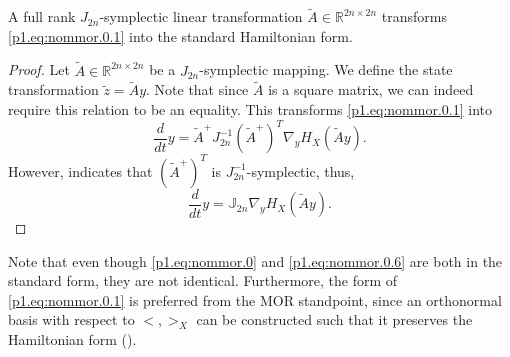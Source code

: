 \begin{lemma} \label{thm:2.1}
A full rank $J_{2n}$-symplectic linear transformation $\tilde A \in \mathbb R^{2n\times 2n}$ transforms \eqref{p1.eq:nommor.0.1} into the standard Hamiltonian form. 
\end{lemma}

\begin{proof}
Let $\tilde A\in \mathbb R^{2n\times 2n}$ be a $J_{2n}$-symplectic mapping. We define the state transformation $\tilde z = \tilde Ay$. Note that since $\tilde A$ is a square matrix, we can indeed require this relation to be an equality. This transforms \eqref{p1.eq:nommor.0.1} into
\begin{equation} \label{p1.eq:nommor.0.5}
	\frac{d}{dt} y = \tilde A^+ J_{2n}^{-1} (\tilde A^+)^T \nabla_y H_X(\tilde Ay).
\end{equation}
However,  indicates that $(\tilde A^+)^T$ is $J_{2n}^{-1}$-symplectic, thus,
\begin{equation} \label{p1.eq:nommor.0.6}
	\frac{d}{dt} y = \mathbb J_{2n} \nabla_y H_X(\tilde Ay).
\end{equation}
\end{proof}
Note that even though \eqref{p1.eq:nommor.0} and \eqref{p1.eq:nommor.0.6} are both in the standard form, they are not identical. Furthermore, the form of \eqref{p1.eq:nommor.0.1} is preferred from the MOR standpoint, since an orthonormal basis with respect to $<,>_X$ can be constructed such that it preserves the Hamiltonian form (). 

